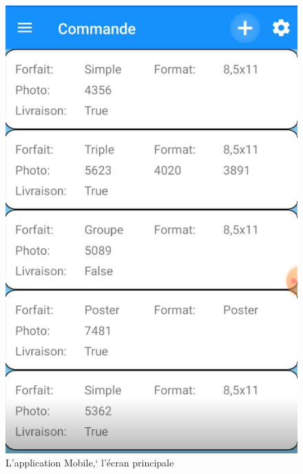 \documentclass[12pt,fleqn]{article}
\begin{document}
\begin{figure}[H]
  \includegraphics{images/AppMobileMainScreen.png}
  \caption{L'application Mobile,` l'écran principale}
\end{figure}
\end{document}
